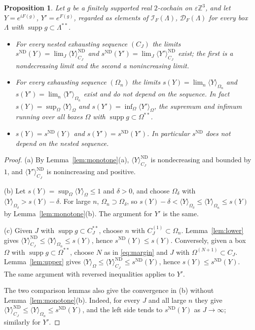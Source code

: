 \documentclass[11pt]{amsart}
\theoremstyle{plain}
\newtheorem{proposition}[theorem]{Proposition}
\theoremstyle{definition}
\theoremstyle{remark}
\numberwithin{equation}{section}
\newcommand{\Z}{\mathbb{Z}}
\newcommand{\eps}{\varepsilon}
\newcommand{\cD}{\mathcal{D}}
\newcommand{\cI}{\mathcal{I}}
\newcommand{\ev}[1]{\langle #1\rangle}
\DeclareMathOperator{\supp}{supp}
\begin{document}
\begin{proposition}\label{prop:limits}
Let $g$ be a finitely supported real $2$-cochain on $\eps\Z^3$, and let $Y=e^{iF(g)}$, $Y'=e^{F(g)}$, regarded as elements of $\cI_F(\Lambda)$, $\cD_F(\Lambda)$ for every box $\Lambda$ with $\supp g\subset\Lambda^{**}$.
\begin{itemize}
\item[(a)] For every nested exhausting sequence $(C_J)$ the limits $s^{\mathrm{ND}}(Y)=\lim_J\ev Y^{\mathrm{ND}}_{C_J}$ and $s^{\mathrm{ND}}(Y')=\lim_J\ev{Y'}^{\mathrm{ND}}_{C_J}$ exist; the first is a nondecreasing limit and the second a nonincreasing limit.
\item[(b)] For every exhausting sequence $(\Omega_n)$ the limits $s(Y)=\lim_n\ev Y_{\Omega_n}$ and $s(Y')=\lim_n\ev{Y'}_{\Omega_n}$ exist and do not depend on the sequence. In fact $s(Y)=\sup_\Omega\ev Y_\Omega$ and $s(Y')=\inf_\Omega\ev{Y'}_\Omega$, the supremum and infimum running over all boxes $\Omega$ with $\supp g\subset\Omega^{**}$.
\item[(c)] $s(Y)=s^{\mathrm{ND}}(Y)$ and $s(Y')=s^{\mathrm{ND}}(Y')$. In particular $s^{\mathrm{ND}}$ does not depend on the nested sequence.
\end{itemize}
\end{proposition}

\begin{proof}
(a) By Lemma~\ref{lem:monotone}(a), $\ev Y^{\mathrm{ND}}_{C_J}$ is nondecreasing and bounded by $1$, and $\ev{Y'}^{\mathrm{ND}}_{C_J}$ is nonincreasing and positive.

(b) Let $s(Y)=\sup_\Omega\ev Y_\Omega\le1$ and $\delta>0$, and choose $\Omega_\delta$ with $\ev Y_{\Omega_\delta}>s(Y)-\delta$. For large $n$, $\Omega_n\supset\Omega_\delta$, so $s(Y)-\delta<\ev Y_{\Omega_\delta}\le\ev Y_{\Omega_n}\le s(Y)$ by Lemma~\ref{lem:monotone}(b). The argument for $Y'$ is the same.

(c) Given $J$ with $\supp g\subset C_J^{**}$, choose $n$ with $C_J^{(1)}\subset\Omega_n$. Lemma~\ref{lem:lower} gives $\ev Y^{\mathrm{ND}}_{C_J}\le\ev Y_{\Omega_n}\le s(Y)$, hence $s^{\mathrm{ND}}(Y)\le s(Y)$. Conversely, given a box $\Omega$ with $\supp g\subset\Omega^{**}$, choose $N$ as in \eqref{eq:margin} and $J$ with $\Omega^{(N+1)}\subset C_J$. Lemma~\ref{lem:upper} gives $\ev Y_\Omega\le\ev Y^{\mathrm{ND}}_{C_J}\le s^{\mathrm{ND}}(Y)$, hence $s(Y)\le s^{\mathrm{ND}}(Y)$. The same argument with reversed inequalities applies to $Y'$.

The two comparison lemmas also give the convergence in (b) without Lemma~\ref{lem:monotone}(b). Indeed, for every $J$ and all large $n$ they give $\ev Y^{\mathrm{ND}}_{C_J}\le\ev Y_{\Omega_n}\le s^{\mathrm{ND}}(Y)$, and the left side tends to $s^{\mathrm{ND}}(Y)$ as $J\to\infty$; similarly for $Y'$.
\end{proof}
\end{document}
